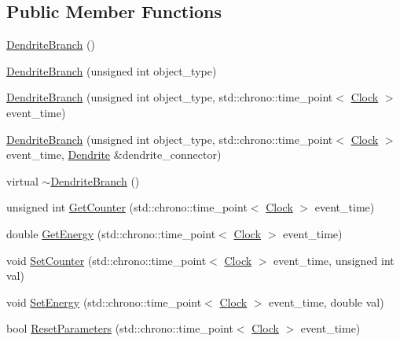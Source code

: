 \subsection*{Public Member Functions}
\begin{DoxyCompactItemize}
\item 
\mbox{\hyperlink{classDendriteBranch_af391f5fd2379539523b3d2523c59ea8b}{Dendrite\+Branch}} ()
\item 
\mbox{\hyperlink{classDendriteBranch_a391ba1440a6c29a0752b03eb60357370}{Dendrite\+Branch}} (unsigned int object\+\_\+type)
\item 
\mbox{\hyperlink{classDendriteBranch_a390bfee680074f5f3ddcd9aee54db679}{Dendrite\+Branch}} (unsigned int object\+\_\+type, std\+::chrono\+::time\+\_\+point$<$ \mbox{\hyperlink{universe_8h_a0ef8d951d1ca5ab3cfaf7ab4c7a6fd80}{Clock}} $>$ event\+\_\+time)
\item 
\mbox{\hyperlink{classDendriteBranch_a9b7e932b0614dad370edd76f31900c40}{Dendrite\+Branch}} (unsigned int object\+\_\+type, std\+::chrono\+::time\+\_\+point$<$ \mbox{\hyperlink{universe_8h_a0ef8d951d1ca5ab3cfaf7ab4c7a6fd80}{Clock}} $>$ event\+\_\+time, \mbox{\hyperlink{classDendrite}{Dendrite}} \&dendrite\+\_\+connector)
\item 
virtual \mbox{\hyperlink{classDendriteBranch_a38707cb6d1f9f07c6e8aa34a8a415051}{$\sim$\+Dendrite\+Branch}} ()
\item 
unsigned int \mbox{\hyperlink{classDendriteBranch_a4d4a4b1591dd612eef903d95605d50fd}{Get\+Counter}} (std\+::chrono\+::time\+\_\+point$<$ \mbox{\hyperlink{universe_8h_a0ef8d951d1ca5ab3cfaf7ab4c7a6fd80}{Clock}} $>$ event\+\_\+time)
\item 
double \mbox{\hyperlink{classDendriteBranch_afab2dd907fba115c3483cd9a217ccec0}{Get\+Energy}} (std\+::chrono\+::time\+\_\+point$<$ \mbox{\hyperlink{universe_8h_a0ef8d951d1ca5ab3cfaf7ab4c7a6fd80}{Clock}} $>$ event\+\_\+time)
\item 
void \mbox{\hyperlink{classDendriteBranch_a2ce03fbad4a70564eeaafb62debd4d74}{Set\+Counter}} (std\+::chrono\+::time\+\_\+point$<$ \mbox{\hyperlink{universe_8h_a0ef8d951d1ca5ab3cfaf7ab4c7a6fd80}{Clock}} $>$ event\+\_\+time, unsigned int val)
\item 
void \mbox{\hyperlink{classDendriteBranch_a13dd0373022d653448c9067d075586a8}{Set\+Energy}} (std\+::chrono\+::time\+\_\+point$<$ \mbox{\hyperlink{universe_8h_a0ef8d951d1ca5ab3cfaf7ab4c7a6fd80}{Clock}} $>$ event\+\_\+time, double val)
\item 
bool \mbox{\hyperlink{classDendriteBranch_a70b5e63fc44166ccd7f0c7177660c250}{Reset\+Parameters}} (std\+::chrono\+::time\+\_\+point$<$ \mbox{\hyperlink{universe_8h_a0ef8d951d1ca5ab3cfaf7ab4c7a6fd80}{Clock}} $>$ event\+\_\+time)

\end{DoxyCompactItemize}
